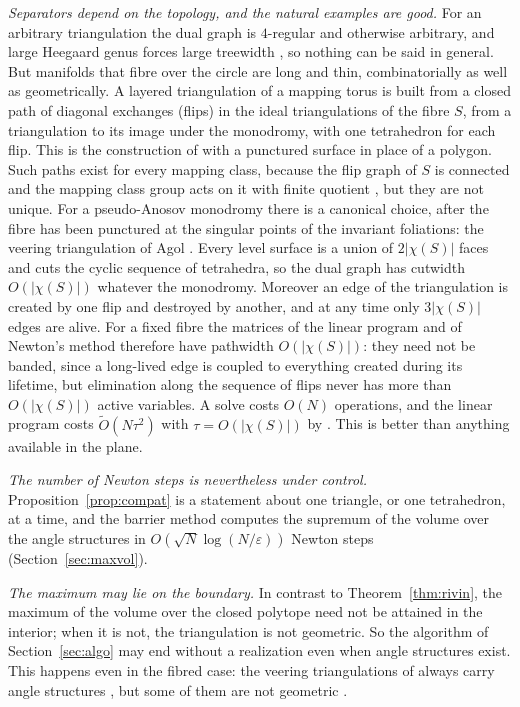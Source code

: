 \documentclass[11pt]{amsart}
\theoremstyle{definition}
\theoremstyle{remark}
\newcommand{\Ot}{\widetilde{O}}
\newcommand{\eps}{\varepsilon}
\begin{document}
\emph{Separators depend on the topology, and the natural examples are good.} For an arbitrary triangulation the dual graph is $4$-regular and otherwise arbitrary, and large Heegaard genus forces large treewidth \cite{HSW19}, so nothing can be said in general.
But manifolds that fibre over the circle are long and thin, combinatorially as well as geometrically. A layered triangulation of a mapping torus is built from a closed path of diagonal exchanges (flips) in the ideal triangulations of the fibre $S$, from a triangulation to its image under the monodromy, with one tetrahedron for each flip. This is the construction of \cite{STT88} with a punctured surface in place of a polygon.
Such paths exist for every mapping class, because the flip graph of $S$ is connected and the mapping class group acts on it with finite quotient \cite{DP19}, but they are not unique. For a pseudo-Anosov monodromy there is a canonical choice, after the fibre has been punctured at the singular points of the invariant foliations: the veering triangulation of Agol \cite{Ago11}.
Every level surface is a union of $2|\chi(S)|$ faces and cuts the cyclic sequence of tetrahedra, so the dual graph has cutwidth $O(|\chi(S)|)$ whatever the monodromy. Moreover an edge of the triangulation is created by one flip and destroyed by another, and at any time only $3|\chi(S)|$ edges are alive. For a fixed fibre the matrices of the linear program and of Newton's method therefore have pathwidth $O(|\chi(S)|)$: they need not be banded, since a long-lived edge is coupled to everything created during its lifetime,
but elimination along the sequence of flips never has more than $O(|\chi(S)|)$ active variables. A solve costs $O(N)$ operations,
and the linear program costs $\Ot(N\tau^2)$ with $\tau=O(|\chi(S)|)$ by \cite[Theorem~1.4]{DGLSY24}. This is better than anything available in the plane.

\emph{The number of Newton steps is nevertheless under control.} Proposition~\ref{prop:compat} is a statement about one triangle, or one tetrahedron, at a time, and the barrier method computes the supremum of the volume over the angle structures in $O(\sqrt N\log(N/\eps))$ Newton steps (Section~\ref{sec:maxvol}).

\emph{The maximum may lie on the boundary.} In contrast to Theorem~\ref{thm:rivin}, the maximum of the volume over the closed polytope need not be attained in the interior; when it is not, the triangulation is not geometric. So the algorithm of Section~\ref{sec:algo} may end without a realization even when angle structures exist.
This happens even in the fibred case: the veering triangulations of \cite{Ago11} always carry angle structures \cite{HRST11}, but some of them are not geometric \cite{HIS16}.
\end{document}
